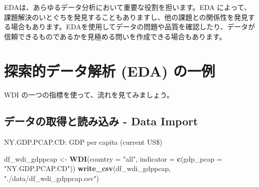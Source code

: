 \documentclass[
  xelatex, ja=standard]{bxjsbook}
\newenvironment{Shaded}{\begin{snugshade}}{\end{snugshade}}
\newcommand{\AttributeTok}[1]{\textcolor[rgb]{0.13,0.29,0.53}{#1}}
\newcommand{\FunctionTok}[1]{\textcolor[rgb]{0.13,0.29,0.53}{\textbf{#1}}}
\newcommand{\NormalTok}[1]{#1}
\newcommand{\OtherTok}[1]{\textcolor[rgb]{0.56,0.35,0.01}{#1}}
\newcommand{\StringTok}[1]{\textcolor[rgb]{0.31,0.60,0.02}{#1}}
\theoremstyle{definition}
\theoremstyle{definition}
\theoremstyle{definition}
\theoremstyle{definition}
\theoremstyle{remark}
\begin{document}
EDAは、あらゆるデータ分析において重要な役割を担います。EDA によって、課題解決のいとぐちを発見することもありますし、他の課題との関係性を発見する場合もあります。EDAを使用してデータの問題や品質を確認したり、データが信頼できるものであるかを見極める問いを作成できる場合もあります。

\hypertarget{ux63a2ux7d22ux7684ux30c7ux30fcux30bfux89e3ux6790-eda-ux306eux4e00ux4f8b}{%
\section{探索的データ解析 (EDA) の一例}\label{ux63a2ux7d22ux7684ux30c7ux30fcux30bfux89e3ux6790-eda-ux306eux4e00ux4f8b}}

WDI の一つの指標を使って、流れを見てみましょう。

\hypertarget{ux30c7ux30fcux30bfux306eux53d6ux5f97ux3068ux8aadux307fux8fbcux307f---data-import}{%
\subsection{データの取得と読み込み - Data Import}\label{ux30c7ux30fcux30bfux306eux53d6ux5f97ux3068ux8aadux307fux8fbcux307f---data-import}}

NY.GDP.PCAP.CD: GDP per capita (current US\$)

\begin{Shaded}
\begin{Highlighting}[]
\NormalTok{df\_wdi\_gdppcap }\OtherTok{\textless{}{-}} \FunctionTok{WDI}\NormalTok{(}\AttributeTok{country =} \StringTok{"all"}\NormalTok{, }\AttributeTok{indicator =} \FunctionTok{c}\NormalTok{(}\AttributeTok{gdp\_pcap =} \StringTok{"NY.GDP.PCAP.CD"}\NormalTok{))}
\FunctionTok{write\_csv}\NormalTok{(df\_wdi\_gdppcap, }\StringTok{"./data/df\_wdi\_gdppcap.csv"}\NormalTok{)}
\end{Highlighting}
\end{Shaded}
\end{document}
